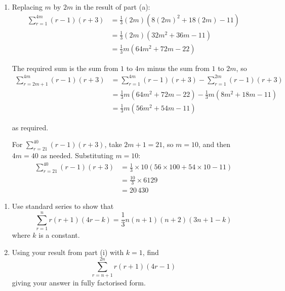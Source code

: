 \documentclass[leqno]{article}
\begin{document}
\begin{enumerate}[
  label=\textbf{\arabic*.},
  leftmargin=*,
  topsep=0pt,
  partopsep=0pt,
  parsep=0pt
]
\begin{djsSolution}
\begin{enumerate}[label=\textbf{(\alph*)}, start=1]
This is in the form \(\frac13 m(am^2+bm+c)\) with \(a=8\), \(b=18\), \(c=-11\).

  \item Replacing \(m\) by \(2m\) in the result of part (a):
\begin{align*}
\sum_{r=1}^{4m}(r-1)(r+3)&=\frac13(2m)\left(8(2m)^2+18(2m)-11\right)\\
&=\frac13(2m)\left(32m^2+36m-11\right)\\
&=\frac13 m\left(64m^2+72m-22\right)
\end{align*}

The required sum is the sum from \(1\) to \(4m\) minus the sum from \(1\) to \(2m\), so
\begin{align*}
\sum_{r=2m+1}^{4m}(r-1)(r+3)&=\sum_{r=1}^{4m}(r-1)(r+3)-\sum_{r=1}^{2m}(r-1)(r+3)\\
&=\frac13 m\left(64m^2+72m-22\right)-\frac13 m\left(8m^2+18m-11\right)\\
&=\frac13 m\left(56m^2+54m-11\right)
\end{align*}

as required.

For \(\sum_{r=21}^{40}(r-1)(r+3)\), take \(2m+1=21\), so \(m=10\), and then \(4m=40\) as needed. Substituting \(m=10\):
\begin{align*}
\sum_{r=21}^{40}(r-1)(r+3)&=\frac13\times 10\left(56\times 100+54\times 10-11\right)\\
&=\frac{10}{3}\times 6129\\
&=20\,430
\end{align*}

\end{enumerate}
\end{djsSolution}

\newpage

\questionitem

\begin{enumerate}[label=\textbf{(\roman*)}]
  \item Use standard series to show that
  \[\sum_{r=1}^{n} r(r+1)(4r-k) = \dfrac{1}{3}n(n+1)(n+2)(3n+1-k)\]
  where $k$ is a constant.  \\
  \item Using your result from part (i) with $k=1$, find
  \[\sum_{r=n+1}^{2n} r(r+1)(4r-1)\]
  giving your answer in fully factorised form.  \\
\end{enumerate}


\end{enumerate}
\end{document}
